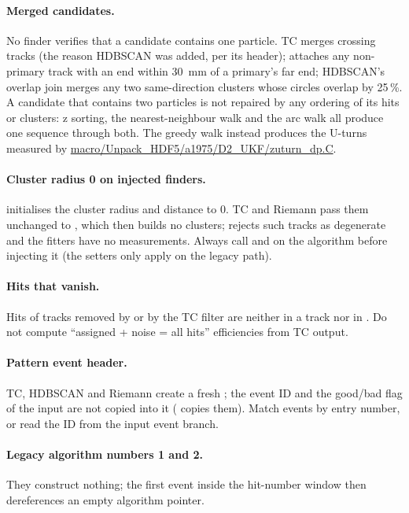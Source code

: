 \paragraph{Merged candidates.} No finder verifies that a candidate contains one particle. TC merges
crossing tracks (the reason HDBSCAN was added, per its header);  attaches any
non-primary track with an end within 30~mm of a primary's far end; HDBSCAN's overlap join merges any two
same-direction clusters whose circles overlap by 25\,\%. A candidate that contains two particles is not
repaired by any ordering of its hits or clusters: z sorting, the nearest-neighbour walk and the arc walk
all produce one sequence through both. The greedy walk instead produces the U-turns measured by
\url{macro/Unpack_HDF5/a1975/D2_UKF/zuturn_dp.C}.

\paragraph{Cluster radius 0 on injected finders.}  initialises the cluster radius and distance
to 0. TC and Riemann pass them unchanged to , which then builds no clusters;
 rejects such tracks as degenerate and the fitters have no measurements. Always
call  and  on the algorithm before injecting it (the
 setters only apply on the legacy path).

\paragraph{Hits that vanish.} Hits of tracks removed by  or by the TC
 filter are neither in a track nor in . Do not compute
``assigned + noise = all hits'' efficiencies from TC output.

\paragraph{Pattern event header.} TC, HDBSCAN and Riemann create a fresh ; the event
ID and the good/bad flag of the input  are not copied into it (
copies them). Match events by entry number, or read the ID from the input event branch.

\paragraph{Legacy algorithm numbers 1 and 2.} They construct nothing; the first event inside the hit-number
window then dereferences an empty algorithm pointer.
